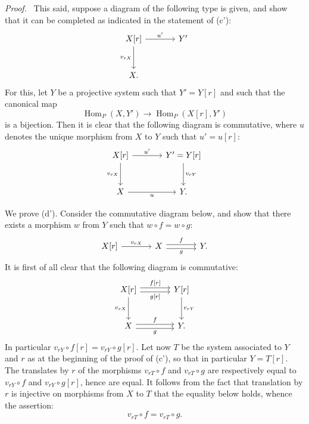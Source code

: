 \documentclass[11pt]{article}
\newenvironment{prooftext}[1][Proof]{\par\noindent\emph{#1.}\ }{\par\medskip}
\DeclareMathOperator{\Hom}{Hom}
\providecommand{\Hom}{\operatorname{Hom}}
\providecommand{\Hom}{\operatorname{Hom}}
\begin{document}
\begin{prooftext}[Proof]
This said, suppose a diagram of the following type is given, and show that it can be completed as indicated in the statement of (c'):
\[
\begin{tikzcd}[column sep=large,row sep=large]
X[r] \arrow[r,"u'"] \arrow[d,"{v_{rX}}"'] & Y'\\
X .
\end{tikzcd}
\]
For this, let $Y$ be a projective system such that $Y'=Y[r]$ and such that the canonical map
\[
\Hom_P(X,Y')\longrightarrow\Hom_P(X[r],Y')
\]
is a bijection. Then it is clear that the following diagram is commutative, where $u$ denotes the unique morphism from $X$ to $Y$ such that $u'=u[r]$:
\[
\begin{tikzcd}[column sep=large,row sep=large]
X[r] \arrow[r,"u'"] \arrow[d,"{v_{rX}}"'] & Y'=Y[r] \arrow[d,"{v_{rY}}"]\\
X \arrow[r,"u"'] & Y .
\end{tikzcd}
\]

We prove (d'). Consider the commutative diagram below, and show that there exists a morphism $w$ from $Y$ such that $w\circ f=w\circ g$:
\[
\begin{tikzcd}[column sep=large]
X[r] \arrow[r,"{v_{rX}}"] & X \arrow[r,shift left,"f"] \arrow[r,shift right,"g"'] & Y .
\end{tikzcd}
\]
It is first of all clear that the following diagram is commutative:
\[
\begin{tikzcd}[column sep=large,row sep=large]
X[r] \arrow[r,shift left,"{f[r]}"] \arrow[r,shift right,"{g[r]}"'] \arrow[d,"{v_{rX}}"'] & Y[r] \arrow[d,"{v_{rY}}"]\\
X \arrow[r,shift left,"f"] \arrow[r,shift right,"g"'] & Y .
\end{tikzcd}
\]
In particular $v_{rY}\circ f[r]=v_{rY}\circ g[r]$. Let now $T$ be the system associated to $Y$ and $r$ as at the beginning of the proof of (c'), so that in particular $Y=T[r]$. The translates by $r$ of the morphisms $v_{rT}\circ f$ and $v_{rT}\circ g$ are respectively equal to $v_{rY}\circ f$ and $v_{rY}\circ g[r]$, hence are equal. It follows from the fact that translation by $r$ is injective on morphisms from $X$ to $T$ that the equality below holds, whence the assertion:
\[
v_{rT}\circ f=v_{rT}\circ g.
\]
\end{prooftext}
\end{document}
